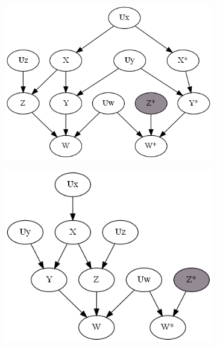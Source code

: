 \begin{figure}
\begin{subfigure}{0.49\linewidth}
		\includegraphics[width=\linewidth]{./images/Chapter 2/count-tn-3.png}
		\caption{}		
		\label{fig:count-tn-c}
	\end{subfigure}
	\begin{subfigure}{0.49\linewidth}
		\centering
		\includegraphics[width=\linewidth]{./images/Chapter 2/count-tn-4.png}
		\caption{}
		\label{fig:count-tn-d}
	\end{subfigure}
	\begin{subfigure}{0.49\linewidth}
		\centering

\end{subfigure}
\end{figure}
